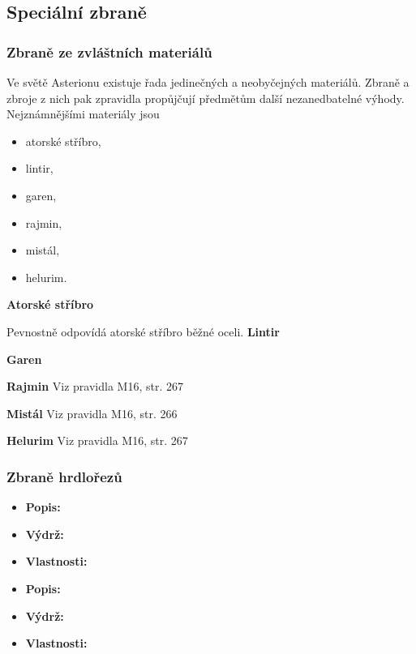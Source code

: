 \documentclass[../main.tex]{subfiles}
\begin{document}
\subsection{Speciální zbraně}
\label{sec:specialni_zbrane}

\subsubsection{Zbraně ze zvláštních materiálů}
\label{sec:materialy}

Ve světě Asterionu existuje řada jedinečných a neobyčejných materiálů. Zbraně a zbroje z nich pak zpravidla propůjčují předmětům další nezanedbatelné výhody. Nejznámnějšími materiály jsou

\begin{itemize}
	\item atorské stříbro,
	\item lintir,
	\item garen,
	\item rajmin,
	\item mistál,
	\item helurim.
\end{itemize}

\textbf{Atorské stříbro}

Pevnostně odpovídá atorské stříbro běžné oceli.
\textbf{Lintir}

\textbf{Garen}

\textbf{Rajmin}
Viz pravidla M16, str. 267 \autocite[267]{stasiakDraciDoupeFate}

\textbf{Mistál}
Viz pravidla M16, str. 266 \autocite[266]{stasiakDraciDoupeFate}

\textbf{Helurim}
Viz pravidla M16, str. 267 \autocite[267]{stasiakDraciDoupeFate}

\subsubsection{Zbraně hrdlořezů}
\label{sec:hrdlorez}

\begin{predmet}
\begin{itemize}
	\item \textbf{Popis:} 
	\item \textbf{Výdrž:} 
	\item \textbf{Vlastnosti:} 
\end{itemize}
\end{predmet}

\begin{predmet}[Stilet]
\begin{itemize}
	\item \textbf{Popis:} 
	\item \textbf{Výdrž:} 
	\item \textbf{Vlastnosti:} 
\end{itemize}
\end{predmet}
\end{document}
